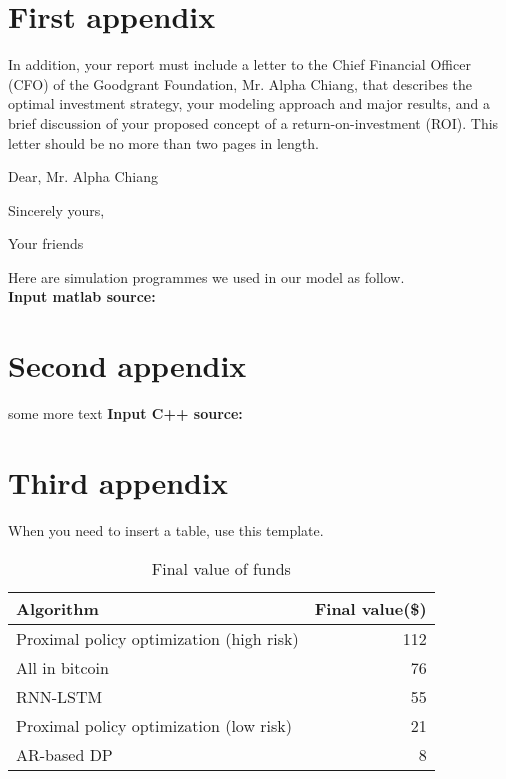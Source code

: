 \documentclass{mcmthesis}
\begin{document}
\begin{appendices}

\section{First appendix}

In addition, your report must include a letter to the Chief Financial Officer (CFO) of the Goodgrant Foundation, Mr. Alpha Chiang, that describes the optimal investment strategy, your modeling approach and major results, and a brief discussion of your proposed concept of a return-on-investment (ROI). This letter should be no more than two pages in length.

\begin{letter}{Dear, Mr. Alpha Chiang}

\lipsum[1-2]

\vspace{\parskip}

Sincerely yours,

Your friends

\end{letter}
Here are simulation programmes we used in our model as follow.\\

\textbf{\textcolor[rgb]{0.98,0.00,0.00}{Input matlab source:}}


\section{Second appendix}

some more text \textcolor[rgb]{0.98,0.00,0.00}{\textbf{Input C++ source:}}




\section{Third appendix}

When you need to insert a table, use this template.

\begin{table}
\centering
\begin{tabular}{@{}lr@{}}
  \toprule
  Algorithm & Final value(\$) \\
  \midrule
  Proximal policy optimization (high risk) & 112 \\
  {\color{gray} All in bitcoin} & {\color{gray} 76} \\
  RNN-LSTM & 55 \\
  Proximal policy optimization (low risk) & 21 \\
  AR-based DP & 8 \\
  \bottomrule
\end{tabular}
\caption{Final value of funds}
\label{final-value123}
\end{table}

\end{appendices}
\end{document}
